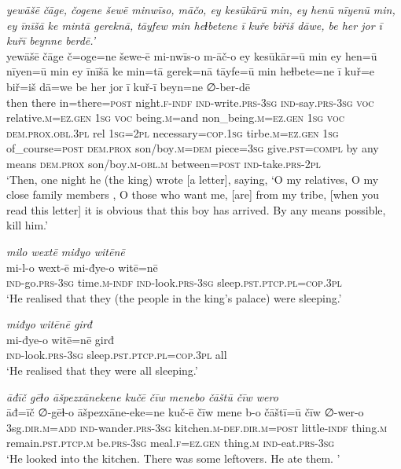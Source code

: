 \ea \label{KŠ.56}
\textit{yewāšē čāge, čogene šewē minwīso, māčo, ey kesūkārū min, ey henū nīyenū min, ey īnīšā ke mintā gereknā, tāyfew min heɫbetene ī kuře biřiš dāwe, be her jor ī kuřī beynne berdē.’} \\ 
\gll yewāšē čāge č=oge=ne šewe-ē mi-nwīs-o m-āč-o ey kesūkār=ū min ey hen=ū nīyen=ū min ey īnīšā ke min=tā gerek=nā tāyfe=ū min heɫbete=ne ī kuř=e biř=iš dā=we be her jor ī kuř-ī beyn=ne ∅-ber-dē \\ 
 then there in=there\textsc{=\textsc{post}} night\textsc{.f}\textsc{-indf} \textsc{ind-}write\textsc{.prs}\textsc{-3sg} \textsc{ind-}say\textsc{.prs}\textsc{-3sg} \textsc{voc} relative\textsc{.m}\textsc{\textsc{=ez.gen}} \textsc{1sg} \textsc{voc} being\textsc{.m}=and non\_being\textsc{.m}\textsc{\textsc{=ez.gen}} \textsc{1sg} \textsc{voc} \textsc{dem.prox}\textsc{.obl}\textsc{.3pl} rel \textsc{1sg}=\textsc{2pl} necessary\textsc{=cop}\textsc{.\textsc{1sg}} tirbe\textsc{.m}\textsc{\textsc{=ez.gen}} \textsc{1sg} of\_course\textsc{=\textsc{post}} \textsc{dem.prox} son/boy\textsc{.m}\textsc{=dem} piece\textsc{=3sg} give\textsc{.pst}\textsc{=compl} by any means \textsc{dem.prox} son/boy\textsc{.m}\textsc{-obl}\textsc{.m} between\textsc{=\textsc{post}} \textsc{ind-}take\textsc{.prs}-\textsc{2pl} \\ 
\glt `Then, one night he (the king) wrote [a letter], saying, ‘O my relatives, O my close family members , O those who want me, [are] from my tribe, [when you read this letter] it is obvious that this boy has arrived. By any means possible, kill him.'
\z 
 
\ea \label{KŠ.61}
\textit{milo wextē miđyo witēnē} \\ 
\gll mi-l-o wext-ē mi-đye-o witē=nē \\ 
 \textsc{ind-}go\textsc{.prs}\textsc{-3sg} time\textsc{.m}\textsc{-indf} \textsc{ind-}look\textsc{.prs}\textsc{-3sg} sleep\textsc{.pst}\textsc{.ptcp}\textsc{.pl}\textsc{=cop}\textsc{.3pl} \\ 
\glt `He realised that they (the people in the king’s palace) were sleeping.'
\z 
 
\ea \label{KŠ.62}
\textit{miđyo witēnē girđ} \\ 
\gll mi-đye-o witē=nē girđ \\ 
 \textsc{ind-}look\textsc{.prs}\textsc{-3sg} sleep\textsc{.pst}\textsc{.ptcp}\textsc{.pl}\textsc{=cop}\textsc{.3pl} all \\ 
\glt `He realised that they were all  sleeping.'
\z 
 
\ea \label{KŠ.63}
\textit{āđīč gēɫo āšpezxānekene kučē čīw menebo čāštū čīw wero} \\ 
\gll āđ=īč ∅-gēɫ-o āšpezxāne-eke=ne kuč-ē čīw mene b-o čāštī=ū čīw ∅-wer-o \\ 
 3sg\textsc{.dir}\textsc{.m}\textsc{=add} \textsc{ind-}wander\textsc{.prs}\textsc{-3sg} kitchen\textsc{.m}\textsc{-def}\textsc{.dir}\textsc{.m}\textsc{=\textsc{post}} little\textsc{-indf} thing\textsc{.m} remain\textsc{.pst}\textsc{.ptcp}\textsc{.m} be\textsc{.prs}\textsc{-3sg} meal\textsc{.f}\textsc{\textsc{=ez.gen}} thing\textsc{.m} \textsc{ind-}eat\textsc{.prs}\textsc{-3sg} \\ 
\glt `He looked into the kitchen. There was some leftovers. He ate them. '
\z 
 
